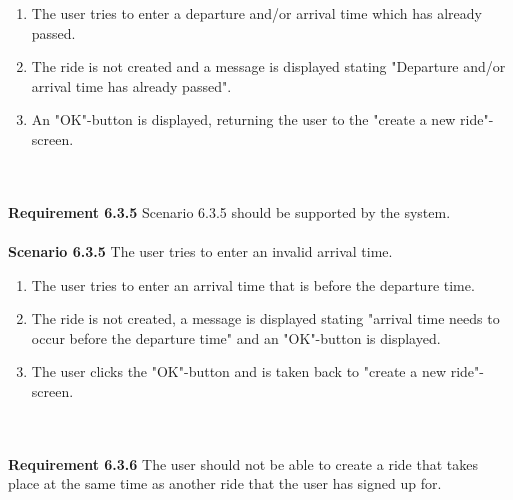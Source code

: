 \documentclass{article}
\begin{document}
\begin{enumerate}
    \item The user tries to enter a departure and/or arrival time which has already passed.
    \item The ride is not created and a message is displayed stating "Departure and/or arrival time has already passed".
    \item An "OK"-button is displayed, returning the user to the "create a new ride"-screen.
\end{enumerate}
\mbox{}\\ \\
\textbf{Requirement 6.3.5} Scenario 6.3.5 should be supported by the system.
\\ \\
\textbf{Scenario 6.3.5} The user tries to enter an invalid arrival time.

\begin{enumerate}
    \item The user tries to enter an arrival time that is before the departure time.
    \item The ride is not created, a message is displayed stating "arrival time needs to occur before the departure time" and an "OK"-button is displayed.
    \item The user clicks the "OK"-button and is taken back to "create a new ride"-screen.
\end{enumerate}
\mbox{}\\ \\
\textbf{Requirement 6.3.6} 
The user should not be able to create a ride that takes place at the same time as another ride that the user has signed up for.
\\ \\
\\ \\
\end{document}
